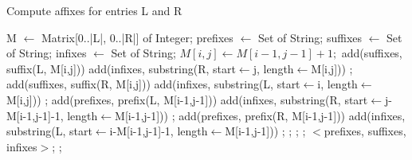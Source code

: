 \documentclass[12pt,a4paper,times,twoside,openright]{report}
\begin{document}
\begin{algorithm}[ht!]
\caption{Compute affixes for entries L and R}
\label{alg:extractAffixes}
\begin{algorithmic}
    \State M $\gets$ Matrix[0..|L|, 0..|R|] of Integer;
    \State prefixes $\gets$ Set of String;
    \State suffixes $\gets$ Set of String;
    \State infixes $\gets$ Set of String;
                \State $M[i,j]\gets M[i-1,j-1] + 1;$
                    \State add(suffixes, suffix(L, M[i,j]))
                        \State add(infixes, substring(R, start$\gets$j, length$\gets$M[i,j]))
                    \EndIf;
                    \State add(suffixes, suffix(R, M[i,j]))
                    \State add(infixes, substring(L, start$\gets$i, length$\gets$M[i,j]))
                \EndIf;
                    \State add(prefixes, prefix(L, M[i-1,j-1]))
                        \State add(infixes, substring(R, start$\gets$j-M[i-1,j-1]-1, length$\gets$M[i-1,j-1]))
                    \EndIf;
                    \State add(prefixes, prefix(R, M[i-1,j-1]))
                    \State add(infixes, substring(L, start$\gets$i-M[i-1,j-1]-1, length$\gets$M[i-1,j-1]))
                \EndIf;
            \EndIf;
        \EndFor;
    \EndFor;
    \State \Return $<$prefixes, suffixes, infixes$>$;
    \EndFunction;
\end{algorithmic}
\end{algorithm}
\end{document}
